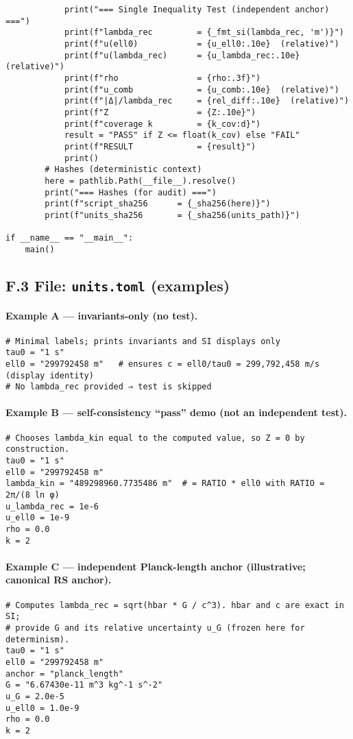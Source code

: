 \documentclass[11pt]{article}
\begin{document}
\begin{proposition}
\begin{verbatim}
            print("=== Single Inequality Test (independent anchor) ===")
            print(f"lambda_rec         = {_fmt_si(lambda_rec, 'm')}")
            print(f"u(ell0)            = {u_ell0:.10e}  (relative)")
            print(f"u(lambda_rec)      = {u_lambda_rec:.10e}  (relative)")
            print(f"rho                = {rho:.3f}")
            print(f"u_comb             = {u_comb:.10e}  (relative)")
            print(f"|Δ|/lambda_rec     = {rel_diff:.10e}  (relative)")
            print(f"Z                  = {Z:.10e}")
            print(f"coverage k         = {k_cov:d}")
            result = "PASS" if Z <= float(k_cov) else "FAIL"
            print(f"RESULT             = {result}")
            print()
        # Hashes (deterministic context)
        here = pathlib.Path(__file__).resolve()
        print("=== Hashes (for audit) ===")
        print(f"script_sha256      = {_sha256(here)}")
        print(f"units_sha256       = {_sha256(units_path)}")

if __name__ == "__main__":
    main()
\end{verbatim}

\subsection*{F.3 File: \texttt{units.toml} (examples)}

\paragraph{Example A — invariants-only (no test).}
\begin{verbatim}
# Minimal labels; prints invariants and SI displays only
tau0 = "1 s"
ell0 = "299792458 m"   # ensures c = ell0/tau0 = 299,792,458 m/s (display identity)
# No lambda_rec provided ⇒ test is skipped
\end{verbatim}

\paragraph{Example B — self-consistency “pass” demo (not an independent test).}
\begin{verbatim}
# Chooses lambda_kin equal to the computed value, so Z = 0 by construction.
tau0 = "1 s"
ell0 = "299792458 m"
lambda_kin = "489298960.7735486 m"  # = RATIO * ell0 with RATIO = 2π/(8 ln φ)
u_lambda_rec = 1e-6
u_ell0 = 1e-9
rho = 0.0
k = 2
\end{verbatim}

\paragraph{Example C — independent Planck-length anchor (illustrative; canonical RS anchor).}
\begin{verbatim}
# Computes lambda_rec = sqrt(hbar * G / c^3). hbar and c are exact in SI;
# provide G and its relative uncertainty u_G (frozen here for determinism).
tau0 = "1 s"
ell0 = "299792458 m"
anchor = "planck_length"
G = "6.67430e-11 m^3 kg^-1 s^-2"
u_G = 2.0e-5
u_ell0 = 1.0e-9
rho = 0.0
k = 2
\end{verbatim}


\end{proposition}
\end{document}
